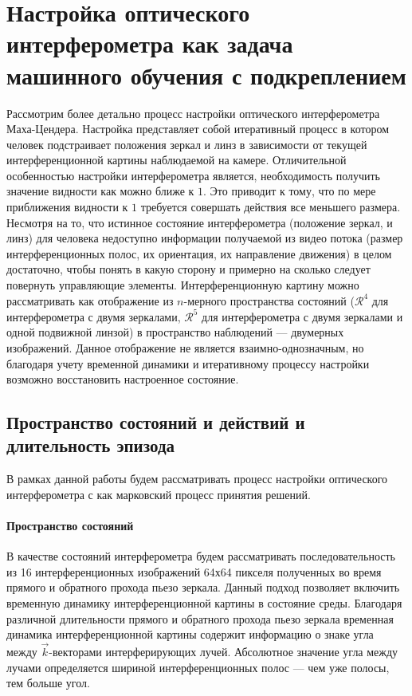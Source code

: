 \section{Настройка оптического интерферометра как задача машинного обучения с подкреплением}\label{sec:ch2/sect2}

Рассмотрим более детально процесс настройки оптического интерферометра Маха-Цендера. Настройка представляет собой итеративный процесс в котором человек подстраивает положения зеркал и линз в зависимости от текущей интерференционной картины наблюдаемой на камере. Отличительной особенностью настройки интерферометра является, необходимость получить значение видности как можно ближе к $1$. Это приводит к тому, что по мере приближения видности к $1$ требуется совершать действия все меньшего размера. Несмотря на то, что истинное состояние интерферометра (положение зеркал, и линз) для человека недоступно информации получаемой из видео потока (размер интерференционных полос, их ориентация, их направление движения) в целом достаточно, чтобы понять в какую сторону и примерно на сколько следует повернуть управляющие элементы. Интерференционную картину можно рассматривать как отображение из $n$-мерного пространства состояний ($\mathcal{R}^4$ для интерферометра с двумя зеркалами, $\mathcal{R}^5$ для интерферометра с двумя зеркалами и одной подвижной линзой) в пространство наблюдений --- двумерных изображений. Данное отображение не является взаимно-однозначным, но благодаря учету временной динамики и итеративному процессу настройки возможно восстановить настроенное состояние. 


\subsection{Пространство состояний и действий и длительность эпизода}

В рамках данной работы будем рассматривать процесс настройки оптического интерферометра с как марковский процесс принятия решений. 

\paragraph{Пространство состояний}
В качестве состояний интерферометра будем рассматривать последовательность из 16 интерференционных изображений 64х64 пикселя полученных во время прямого и обратного прохода пьезо зеркала. Данный подход позволяет включить временную динамику интерференционной картины в состояние среды. Благодаря различной длительности прямого и обратного прохода пьезо зеркала временная динамика интерференционной картины содержит информацию о знаке угла между $\vec{k}$-векторами интерферирующих лучей. Абсолютное значение угла между лучами определяется шириной интерференционных полос --- чем уже полосы, тем больше угол.

